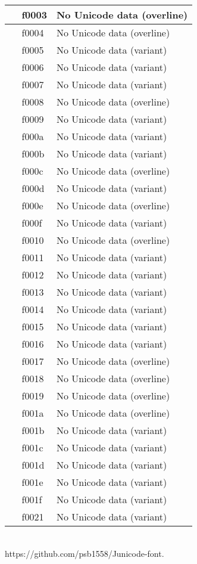 \documentclass[12pt,letterpaper,openany]{book}
\begin{document}
\begin{center}
\begin{supertabular}{|m{0.25in}|m{0.5in}|m{4in}|}
󰀃 & f0003 & No Unicode data (overline)\\\hline
󰀄 & f0004 & No Unicode data (overline)\\\hline
󰀅 & f0005 & No Unicode data (variant)\\\hline
󰀆 & f0006 & No Unicode data (variant)\\\hline
󰀇 & f0007 & No Unicode data (variant)\\\hline
󰀈 & f0008 & No Unicode data (overline)\\\hline
󰀉 & f0009 & No Unicode data (variant)\\\hline
󰀊 & f000a & No Unicode data (variant)\\\hline
󰀋 & f000b & No Unicode data (variant)\\\hline
󰀌 & f000c & No Unicode data (overline)\\\hline
󰀍 & f000d & No Unicode data (variant)\\\hline
󰀎 & f000e & No Unicode data (overline)\\\hline
󰀏 & f000f & No Unicode data (variant)\\\hline
󰀐 & f0010 & No Unicode data (overline)\\\hline
󰀑 & f0011 & No Unicode data (variant)\\\hline
󰀒 & f0012 & No Unicode data (variant)\\\hline
󰀓 & f0013 & No Unicode data (variant)\\\hline
󰀔 & f0014 & No Unicode data (variant)\\\hline
󰀕 & f0015 & No Unicode data (variant)\\\hline
󰀖 & f0016 & No Unicode data (variant)\\\hline
󰀗 & f0017 & No Unicode data (overline)\\\hline
󰀘 & f0018 & No Unicode data (overline)\\\hline
󰀙 & f0019 & No Unicode data (overline)\\\hline
󰀚 & f001a & No Unicode data (overline)\\\hline
󰀛 & f001b & No Unicode data (variant)\\\hline
󰀜 & f001c & No Unicode data (variant)\\\hline
󰀝 & f001d & No Unicode data (variant)\\\hline
󰀞 & f001e & No Unicode data (variant)\\\hline
󰀟 & f001f & No Unicode data (variant)\\\hline
󰀡 & f0021 & No Unicode data (variant)\\\hline
\end{supertabular}
\end{center}

\vspace*{\fill}
\begin{center}
{}\\
{\color{myRed}https://github.com/psb1558/Junicode-font.}
\end{center}
\end{document}
